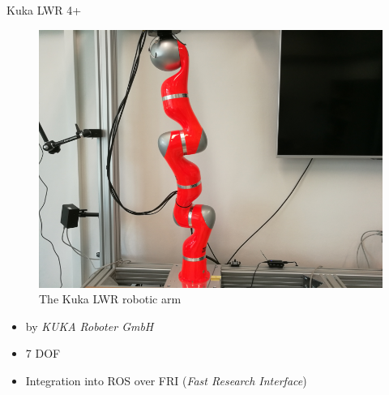 \documentclass[t]{beamer}
\begin{document}
\begin{frame}{Kuka LWR 4+}
\begin{minipage}{0.45\linewidth}
	\begin{figure}
		\includegraphics[width=\linewidth]{assets/chpt_basics/arm.png}
		\caption{The Kuka LWR robotic arm}
	\end{figure}
\end{minipage}
\begin{minipage}{0.5\linewidth}
	\begin{itemize}
		\item by \textit{KUKA Roboter GmbH} \cite{Lwr2010}
		\item 7 DOF
		\item Integration into ROS over FRI (\textit{Fast Research Interface})\cite{Fri2010}
	\end{itemize}
\end{minipage}
\end{frame}
\end{document}
